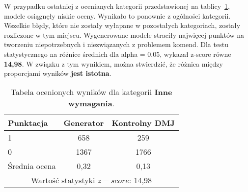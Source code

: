 W przypadku ostatniej z ocenianych kategorii przedstawionej na tablicy~\ref{tab:tabela22}, modele osiągnęły niskie oceny. Wynikało to ponownie z ogólności kategorii. Wszelkie błędy, które nie zostały wyłapane w pozostałych kategoriach, zostały rozliczone w tym miejscu. Wygenerowane modele straciły najwięcej punktów na tworzeniu niepotrzebnych i niezwiązanych z problemem komend. Dla testu statystycznego na różnice średnich dla alpha = 0,05, wykazał z-score równe \textbf{14,98}. W związku z tym wynikiem, można stwierdzić, że różnica między proporcjami wyników \textbf{jest istotna}.

\begin{table}[H]
\caption{Tabela ocenionych wyników dla kategorii \textbf{Inne wymagania}.}\label{tab:tabela22}
\centering%
\begin{tabular}{|l|c|c|}
\hline
\textbf{Punktacja} & \textbf{Generator} & \textbf{Kontrolny DMJ}\\
\hline
1 & 658 & 259 \\
\hline
0 & 1367 & 1766 \\
\hline
Średnia ocena & 0,32 & 0,13 \\
\hline
\multicolumn{3}{|c|}{Wartość statystyki \( z-score \): 14,98} \\
\hline
\end{tabular}
\end{table}
